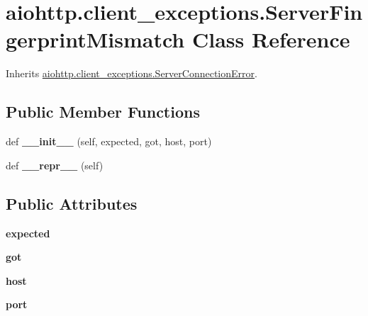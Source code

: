 \hypertarget{classaiohttp_1_1client__exceptions_1_1_server_fingerprint_mismatch}{}\section{aiohttp.\+client\+\_\+exceptions.\+Server\+Fingerprint\+Mismatch Class Reference}
\label{classaiohttp_1_1client__exceptions_1_1_server_fingerprint_mismatch}


Inherits \hyperlink{classaiohttp_1_1client__exceptions_1_1_server_connection_error}{aiohttp.\+client\+\_\+exceptions.\+Server\+Connection\+Error}.

\subsection*{Public Member Functions}
\begin{DoxyCompactItemize}
\item 
\mbox{\label{classaiohttp_1_1client__exceptions_1_1_server_fingerprint_mismatch_af446c8b9adedc34d09aeee4836c0aae0}} 
def {\bfseries \+\_\+\+\_\+init\+\_\+\+\_\+} (self, expected, got, host, port)
\item 
\mbox{\label{classaiohttp_1_1client__exceptions_1_1_server_fingerprint_mismatch_ace889466b361c0c76e7ee8c77e7adcef}} 
def {\bfseries \+\_\+\+\_\+repr\+\_\+\+\_\+} (self)
\end{DoxyCompactItemize}
\subsection*{Public Attributes}
\begin{DoxyCompactItemize}
\item 
\mbox{\label{classaiohttp_1_1client__exceptions_1_1_server_fingerprint_mismatch_a6d98b32cb132066d729d9329ca10550c}} 
{\bfseries expected}
\item 
\mbox{\label{classaiohttp_1_1client__exceptions_1_1_server_fingerprint_mismatch_a5df411f7b52b1acdf042314bf0aab9ef}} 
{\bfseries got}
\item 
\mbox{\label{classaiohttp_1_1client__exceptions_1_1_server_fingerprint_mismatch_adf1bfe5fce530eaa421753d27a50eec6}} 
{\bfseries host}
\item 
\mbox{\label{classaiohttp_1_1client__exceptions_1_1_server_fingerprint_mismatch_a3bccb0ce7a4e6c1bdfef12bf9ad78a21}} 
{\bfseries port}
\end{DoxyCompactItemize}


